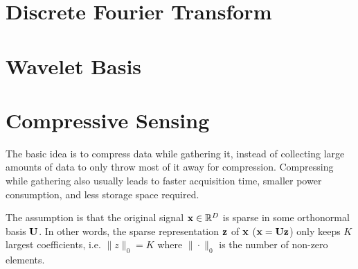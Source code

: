 \section{Discrete Fourier Transform}

\section{Wavelet Basis}

\section{Compressive Sensing}
The basic idea is to compress data while gathering it, instead of collecting large amounts of data to only throw most of it away for compression. Compressing while gathering also usually leads to faster acquisition time, smaller power consumption, and less storage space required.

The assumption is that the original signal \(\boldsymbol{\mathrm{x}} \in \mathbb{R}^D\) is sparse in some orthonormal basis \(\boldsymbol{\mathrm{U}}\). In other words, the sparse representation \(\boldsymbol{\mathrm{z}}\) of \(\boldsymbol{\mathrm{x}}\) (\(\boldsymbol{\mathrm{x}} = \boldsymbol{\mathrm{Uz}}\)) only keeps \(K\) largest coefficients, i.e. \(\| z \|_0 = K\) where \(\| \cdot \|_0\) is the number of non-zero elements.

